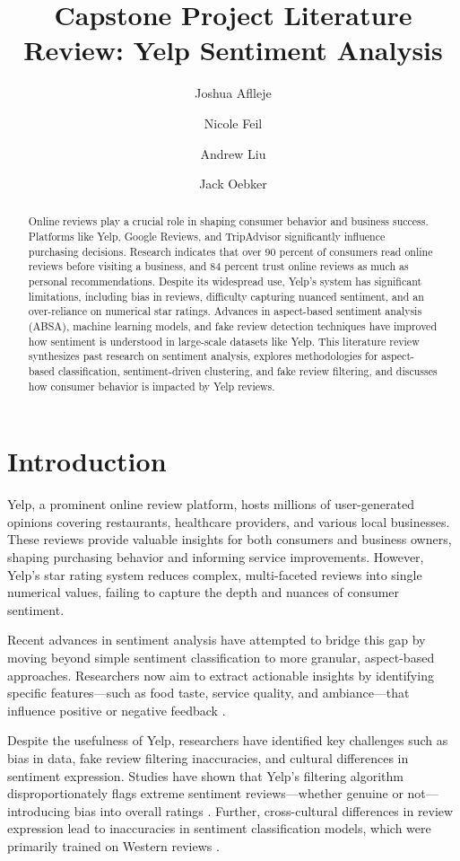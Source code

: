 \documentclass{article}
\title{Capstone Project Literature Review: Yelp Sentiment Analysis}
\author{Joshua Aflleje}
\author{Nicole Feil}
\author{Andrew Liu}
\author{Jack Oebker}
\affil{Arizona State University, Tempe, AZ 85281, USA}
\begin{document}
\maketitle
\begin{abstract}
Online reviews play a crucial role in shaping consumer behavior and business success. Platforms like Yelp, Google Reviews, and TripAdvisor significantly influence purchasing decisions. Research indicates that over 90 percent of consumers read online reviews before visiting a business, and 84 percent trust online reviews as much as personal recommendations. Despite its widespread use, Yelp’s system has significant limitations, including bias in reviews, difficulty capturing nuanced sentiment, and an over-reliance on numerical star ratings. Advances in aspect-based sentiment analysis (ABSA), machine learning models, and fake review detection techniques have improved how sentiment is understood in large-scale datasets like Yelp. This literature review synthesizes past research on sentiment analysis, explores methodologies for aspect-based classification, sentiment-driven clustering, and fake review filtering, and discusses how consumer behavior is impacted by Yelp reviews.
\end{abstract}

\section{Introduction}

Yelp, a prominent online review platform, hosts millions of user-generated opinions covering restaurants, healthcare providers, and various local businesses. These reviews provide valuable insights for both consumers and business owners, shaping purchasing behavior and informing service improvements. However, Yelp's star rating system reduces complex, multi-faceted reviews into single numerical values, failing to capture the depth and nuances of consumer sentiment.

Recent advances in sentiment analysis have attempted to bridge this gap by moving beyond simple sentiment classification to more granular, aspect-based approaches. Researchers now aim to extract actionable insights by identifying specific features—such as food taste, service quality, and ambiance—that influence positive or negative feedback \cite{HuLiu2004}. 

Despite the usefulness of Yelp, researchers have identified key challenges such as bias in data, fake review filtering inaccuracies, and cultural differences in sentiment expression. Studies have shown that Yelp’s filtering algorithm disproportionately flags extreme sentiment reviews—whether genuine or not—introducing bias into overall ratings \cite{Mukherjee2021}. Further, cross-cultural differences in review expression lead to inaccuracies in sentiment classification models, which were primarily trained on Western reviews \cite{NakayamaWan2019}.
\end{document}
